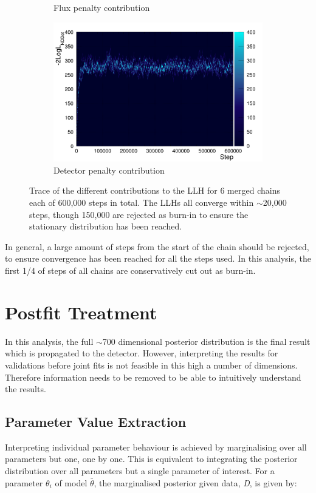 \begin{figure}
\begin{subfigure}{.5\textwidth}
  \caption{Flux penalty contribution}
\end{subfigure}%
\begin{subfigure}{.5\textwidth}
  \centering
  \includegraphics[width=0.85\linewidth]{figs/llh_nddet}
  \caption{Detector penalty contribution}
\end{subfigure}
\caption{Trace of the different contributions to the LLH for 6 merged chains each of 600,000 steps in total. The LLHs all converge within $\sim$20,000 steps, though 150,000 are rejected as burn-in to ensure the stationary distribution has been reached.}
\label{fig:llhs}
\end{figure}

In general, a large amount of steps from the start of the chain should be rejected, to ensure convergence has been reached for all the steps used. In this analysis, the first 1/4 of steps of all chains are conservatively cut out as burn-in.

\section{Postfit Treatment}\label{sec:postfit}

In this analysis, the full $\sim$700 dimensional posterior distribution is the final result which is propagated to the detector. However, interpreting the results for validations before joint fits is not feasible in this high a number of dimensions. Therefore information needs to be removed to be able to intuitively understand the results. 

\subsection{Parameter Value Extraction}\label{sec:extrac}

Interpreting individual parameter behaviour is achieved by marginalising over all parameters but one, one by one. This is equivalent to integrating the posterior distribution over all parameters but a single parameter of interest. For a parameter $\theta_i$ of model $\bar{\theta}$, the marginalised posterior given data, \textit{D}, is given by:

